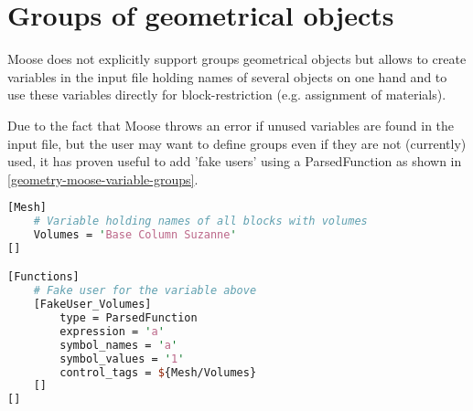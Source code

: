 \section{Groups of geometrical objects}
\label{geometry-groups}

Moose does not explicitly support groups geometrical objects but allows to
create variables in the input file holding names of several objects on one hand
and to use these variables directly for block-restriction (e.g. assignment of
materials).

Due to the fact that Moose throws an error if unused variables are found in the
input file, but the user may want to define groups even if they are not
(currently) used, it has proven useful to add 'fake users' using a
ParsedFunction as shown in \autoref{geometry-moose-variable-groups}.

\begin{lstlisting}[language=Perl, float, caption={Moose input file fragment: variable holding several block names and fake-user},label={geometry-moose-variable-groups}]
[Mesh]
    # Variable holding names of all blocks with volumes
    Volumes = 'Base Column Suzanne'
[]

[Functions]
    # Fake user for the variable above
    [FakeUser_Volumes]
        type = ParsedFunction
        expression = 'a'
        symbol_names = 'a'
        symbol_values = '1'
        control_tags = ${Mesh/Volumes}
    []
[]
\end{lstlisting}

